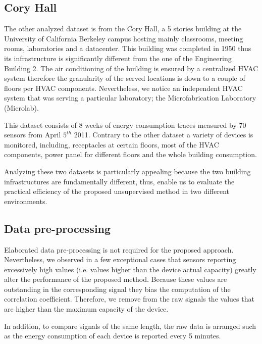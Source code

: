 
\subsection{Cory Hall}
The other analyzed dataset is from the Cory Hall, a 5 stories building at the University of California Berkeley campus hosting mainly classrooms, meeting rooms, laboratories and a datacenter.
This building was completed in 1950 thus its infrastructure is significantly different from the one of the Engineering Building 2.
The air conditioning of the building is ensured by a centralized HVAC system therefore the granularity of the served locations is down to a couple of floors per HVAC components.
Nevertheless, we notice an independent HVAC system that was serving a particular laboratory; the Microfabrication Laboratory (Microlab).

This dataset consists of 8 weeks of energy consumption traces measured by 70 sensors from April $5^{th}$ 2011.
Contrary to the other dataset a variety of devices is monitored, including,	 receptacles at certain floors, most of the HVAC components, power panel for different floors and the whole building consumption.

Analyzing these two datasets is particularly appealing because the two building infrastructures are fundamentally different, thus, enable us to evaluate the practical efficiency of the proposed unsupervised method in two different environments.


\subsection{Data pre-processing}
Elaborated data pre-processing is not required for the proposed approach.
Nevertheless, we observed in a few exceptional cases that sensors reporting excessively high values (i.e. values higher than the device actual capacity) greatly alter the performance of the proposed method.
Because these values are outstanding in the corresponding signal they bias the computation of the correlation coefficient.
Therefore, we remove from the raw signals the values that are higher than the maximum capacity of the device.

In addition, to compare signals of the same length, the raw data is arranged such as the energy consumption of each device is reported every 5 minutes. 

